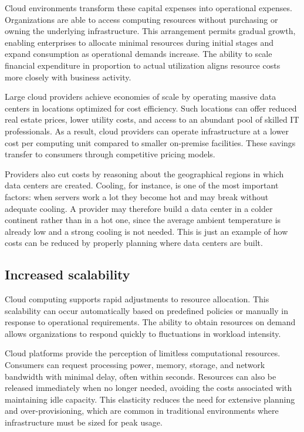Cloud environments transform these capital expenses into operational expenses. Organizations are able to access computing resources without purchasing or owning the underlying infrastructure. This arrangement permits gradual growth, enabling enterprises to allocate minimal resources during initial stages and expand consumption as operational demands increase. The ability to scale financial expenditure in proportion to actual utilization aligns resource costs more closely with business activity.

Large cloud providers achieve economies of scale by operating massive data centers in locations optimized for cost efficiency. Such locations can offer reduced real estate prices, lower utility costs, and access to an abundant pool of skilled IT professionals. As a result, cloud providers can operate infrastructure at a lower cost per computing unit compared to smaller on-premise facilities. These savings transfer to consumers through competitive pricing models.

Providers also cut costs by reasoning about the geographical regions in which data centers are created. Cooling, for instance, is one of the most important factors: when servers work a lot they become hot and may break without adequate cooling. A provider may therefore build a data center in a colder continent rather than in a hot one, since the average ambient temperature is already low and a strong cooling is not needed. This is just an example of how costs can be reduced by properly planning where data centers are built.

\subsection{Increased scalability}

Cloud computing supports rapid adjustments to resource allocation. This scalability can occur automatically based on predefined policies or manually in response to operational requirements. The ability to obtain resources on demand allows organizations to respond quickly to fluctuations in workload intensity.

Cloud platforms provide the perception of limitless computational resources. Consumers can request processing power, memory, storage, and network bandwidth with minimal delay, often within seconds. Resources can also be released immediately when no longer needed, avoiding the costs associated with maintaining idle capacity. This elasticity reduces the need for extensive planning and over-provisioning, which are common in traditional environments where infrastructure must be sized for peak usage.

